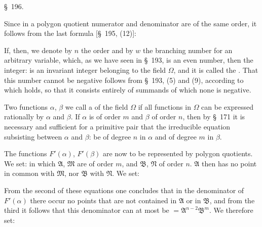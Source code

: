 \S\ 196. 

Since in a polygon quotient numerator and denominator are of the same order, it follows from the last formula [\S\ 195, (12)]:

If, then, we denote by $n$ the order and by $w$ the branching number for an arbitrary variable, which, as we have seen in \S\ 193, is an even number, then the integer:
is an invariant integer belonging to the field $\Omega$, and it is called the . That this number cannot be negative follows from \S\ 193, (5) and (9), according to which
holds, so that it consists entirely of summands of which none is negative.

Two functions $\alpha$, $\beta$ we call a  of the field $\Omega$ if all functions in $\Omega$ can be expressed rationally by $\alpha$ and $\beta$. If $\alpha$ is of order $m$ and $\beta$ of order $n$, then by \S\ 171 it is necessary and sufficient for a primitive pair that the irreducible equation subsisting between $\alpha$ and $\beta$:
be of degree $n$ in $\alpha$ and of degree $m$ in $\beta$.

The functions $F'(\alpha)$, $F'(\beta)$ are now to be represented by polygon quotients. We set:
in which $\mathfrak{A}$, $\mathfrak{M}$ are of order $m$, and $\mathfrak{B}$, $\mathfrak{N}$ of order $n$. $\mathfrak{A}$ then has no point in common with $\mathfrak{M}$, nor $\mathfrak{B}$ with $\mathfrak{N}$. We set:

From the second of these equations one concludes that in the denominator of $F'(\alpha)$ there occur no points that are not contained in $\mathfrak{A}$ or in $\mathfrak{B}$, and from the third it follows that this denominator can at most be $= \mathfrak{A}^{n-2}\mathfrak{B}^m$. We therefore set:
